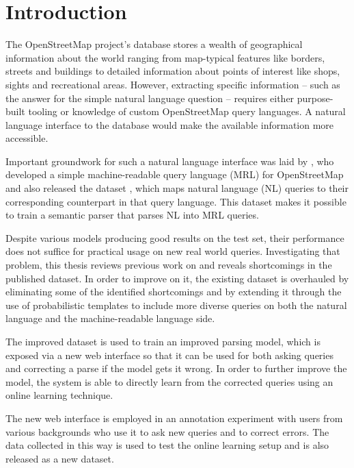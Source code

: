 \chapter{Introduction}
\label{ch:introduction}

The OpenStreetMap project’s database stores a wealth of geographical information
about the world ranging from map-typical features like borders, streets and
buildings to detailed information about points of interest like shops, sights
and recreational areas. However, extracting specific information – such as the
answer for the simple natural language question  – requires either purpose-built tooling or
knowledge of custom OpenStreetMap query languages. A natural language interface
to the database would make the available information more accessible.

Important groundwork for such a natural language interface was laid by
\textcite{haas-2016}, who developed a simple machine-readable query language
(MRL) for OpenStreetMap and also released the dataset \emph{\nlmaps{}}, which
maps natural language (NL) queries to their corresponding counterpart in that
query language. This dataset makes it possible to train a semantic parser that
parses NL into MRL queries.

Despite various models producing good results on the \nlmaps{} test set, their
performance does not suffice for practical usage on new real world queries.
Investigating that problem, this thesis reviews previous work on \nlmaps{} and
reveals shortcomings in the published dataset. In order to improve on it, the
existing dataset is overhauled by eliminating some of the identified
shortcomings and by extending it through the use of probabilistic templates to
include more diverse queries on both the natural language and the
machine-readable language side.

The improved \nlmaps{} dataset is used to train an improved parsing model, which
is exposed via a new web interface so that it can be used for both asking
queries and correcting a parse if the model gets it wrong. In order to further
improve the model, the system is able to directly learn from the corrected
queries using an online learning technique.

The new web interface is employed in an annotation experiment with users from
various backgrounds who use it to ask new queries and to correct errors. The
data collected in this way is used to test the online learning setup and is also
released as a new \nlmaps{} dataset.


